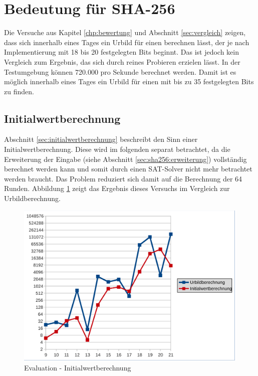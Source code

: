 \section{Bedeutung für SHA-256}

Die Versuche aus Kapitel \ref{chp:bewertung} und Abschnitt \ref{sec:vergleich} zeigen, dass sich innerhalb eines Tages
ein Urbild für einen  berechnen lässt, der je nach Implementierung mit 18 bis 20 festgelegten Bits beginnt. Das ist jedoch
kein Vergleich zum Ergebnis, das sich durch reines Probieren erzielen lässt. In der Testumgebung können 720.000  pro Sekunde
berechnet werden. Damit ist es möglich innerhalb eines Tages ein Urbild für einen  mit bis zu 35 festgelegten Bits zu finden.

\subsection{Initialwertberechnung}
Abschnitt \ref{sec:initialwertberechnung} beschreibt den Sinn einer Initialwertberechnung. Diese wird im folgenden separat
betrachtet, da die Erweiterung der Eingabe (siehe Abschnitt \ref{sec:sha256:erweiterung}) vollständig berechnet werden kann
und somit durch einen SAT-Solver nicht mehr betrachtet werden braucht. Das Problem reduziert sich damit auf die Berechnung
der 64 Runden. Abbildung \ref{fig:eval_initial} zeigt das Ergebnis dieses Versuchs im Vergleich zur Urbildberechnung.
\begin{figure}[!h]
  \centering
  \includegraphics[scale=0.55]{images/eval_initial}
  \caption{Evaluation - Initialwertberechnung}
  \label{fig:eval_initial}
\end{figure}

